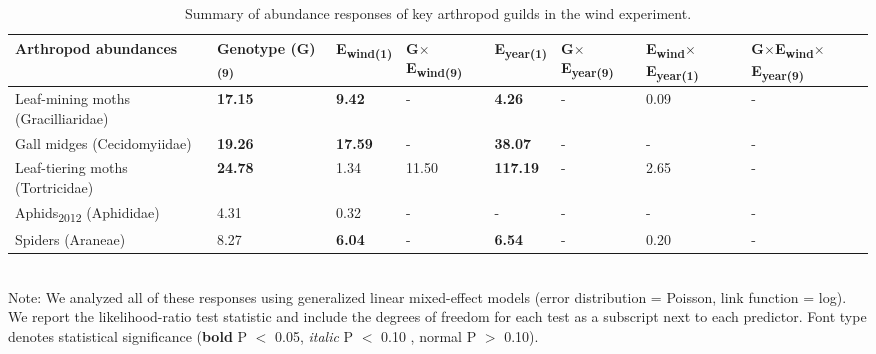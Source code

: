 \documentclass[11pt]{article}
\begin{document}
\begin{table}
\centering
\caption{Summary of abundance responses of key arthropod
guilds in the wind experiment.}
\label{TableS2}
\begin{tabular}{@{}llllllll@{}}
\toprule
Arthropod abundances & Genotype (G)\textsubscript{(9)} &
E\textsubscript{wind(1)} & G$\times$E\textsubscript{wind(9)} & E\textsubscript{year(1)} & G$\times$E\textsubscript{year(9)} & E\textsubscript{wind}$\times$E\textsubscript{year(1)} & G$\times$E\textsubscript{wind}$\times$E\textsubscript{year(9)}\tabularnewline
\midrule
Leaf-mining moths (Gracilliaridae) & \textbf{17.15} & \textbf{9.42} & -
& \textbf{4.26} & - & 0.09 & -\tabularnewline
Gall midges (Cecidomyiidae) & \textbf{19.26} & \textbf{17.59} & - &
\textbf{38.07} & - & - & -\tabularnewline
Leaf-tiering moths (Tortricidae) & \textbf{24.78} & 1.34 & 11.50 &
\textbf{117.19} & - & 2.65 & -\tabularnewline
Aphids\textsubscript{2012} (Aphididae) & 4.31 & 0.32 & - & - & - & - & -\tabularnewline
Spiders (Araneae) & 8.27 & \textbf{6.04} & - & \textbf{6.54} & - & 0.20
& -\tabularnewline
\bottomrule
\end{tabular}
\bigskip{}
\\
{\footnotesize Note: We analyzed all of these responses
using generalized linear mixed-effect models (error distribution = Poisson, link function = log). We report the likelihood-ratio test statistic and include the degrees of freedom for each test as a subscript next to each predictor. Font type denotes statistical significance (\textbf{bold} P $<$ 0.05, \textit{italic} P $<$ 0.10 , normal P $>$ 0.10).}
\end{table}
 
\end{document}
